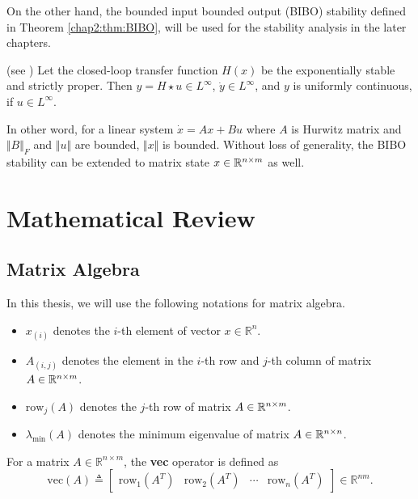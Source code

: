 
On the other hand, the bounded input bounded output (BIBO) stability defined in Theorem \ref{chap2:thm:BIBO}, will be used for the stability analysis in the later chapters.

\begin{theorem}(see \cite[Theorem 1.9]{RN23})
  Let the closed-loop transfer function $H(x)$ be the exponentially stable and strictly proper.
  Then $y = H\star u\in L^\infty$, $\dot y\in L^\infty$, and $y$ is uniformly continuous, if $u\in L^\infty$.
  \label{chap2:thm:BIBO}
\end{theorem}

In other word, for a linear system $\dot x=Ax+Bu$ where $A$ is Hurwitz matrix and $\Vert B\Vert_F$ and $\Vert u\Vert$ are bounded, $\Vert x\Vert$ is bounded.
Without loss of generality, the BIBO stability can be extended to matrix state $x\in\mathbb{R}^{n\times m}$ as well.

\section{Mathematical Review} 

\subsection{Matrix Algebra} 

In this thesis, we will use the following notations for matrix algebra.
\begin{itemize}
  \item $x_{(i)}$ denotes the $i$-th element of vector $x\in\mathbb R^n$.
  \item $A_{(i,j)}$ denotes the element in the $i$-th row and $j$-th column of matrix $A\in\mathbb{R}^{n\times m}$.
  \item $\text{row}_j(A)$ denotes the $j$-th row of matrix $A\in\mathbb{R}^{n\times m}$.
  \item $\lambda_\text{min}(A)$ denotes the minimum eigenvalue of matrix $A\in\mathbb{R}^{n\times n}$.
\end{itemize}

For a matrix $A\in\mathbb R^{n\times m}$, the \textbf{vec} operator is defined as
\begin{equation}
  \text{vec}(A) \triangleq 
  \begin{bmatrix}
      \text{row}_1(A^T) & \text{row}_2(A^T) & \cdots & \text{row}_n(A^T)
  \end{bmatrix}
  \in\mathbb R^{nm}
  .
\end{equation}

